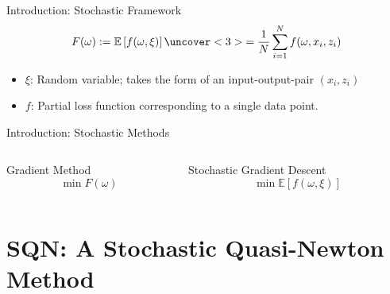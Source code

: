 \documentclass[10pt]{beamer}
\begin{document}
  \begin{frame}{Introduction: Stochastic Framework}
    $$ F(\omega) := \mathbb{E}\left[f(\omega, \xi)\right] \uncover<3>{= \frac{1}{N}\sum_{i=1}^N f(\omega, x_i, z_i)}$$
    \begin{itemize}
      \item<2-> \alert{$\xi$}: Random variable; takes the form of an input-output-pair $(x_i, z_i)$
      \item<3-> \alert{$f$}: Partial loss function corresponding to a single data point.
    \end{itemize}
  \end{frame}

  \begin{frame}{Introduction: Stochastic Methods}
    \begin{columns}[T]
      \begin{column}{.5\textwidth}
        \centering \alert{Gradient Method}
        $$\min F(\omega) $$

      \end{column}\hfill
      \begin{column}{.5\textwidth}
        \centering \alert{Stochastic Gradient Descent}
        $$\min \mathbb E \left [f(\omega, \xi)\right]$$
      \end{column}
    \end{columns}
  \end{frame}

\section{SQN: A Stochastic Quasi-Newton Method}
\end{document}
